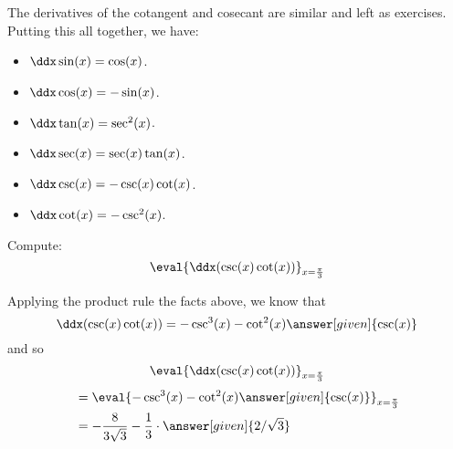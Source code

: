 \documentclass{ximera}
\begin{document}
The derivatives of the cotangent and cosecant are similar and left as
exercises.  Putting this all together, we have:

\begin{theorem} \hfil
\begin{itemize}
\item $\ddx \sin(x) = \cos(x)$.
\item $\ddx \cos(x) = -\sin(x)$.
\item $\ddx \tan(x) = \sec^2(x)$.
\item $\ddx \sec(x) = \sec(x)\tan(x)$.
\item $\ddx \csc(x) = -\csc(x)\cot(x)$.
\item $\ddx \cot(x) = -\csc^2(x)$.
\end{itemize}
\end{theorem}

\begin{example}
Compute:
\[
\eval{\ddx ( \csc(x) \cot(x) )}_{x=\frac{\pi}{3}}
\]
\begin{explanation}
Applying the product rule the facts above, we know that
\[
\ddx ( \csc(x) \cot(x) ) = - \csc^3(x) - \cot^2(x)\answer[given]{\csc(x)}
\]
and so
\[
\eval{\ddx ( \csc(x) \cot(x) )}_{x=\frac{\pi}{3}}
\]
\begin{align*}
  &= \eval{  - \csc^3(x) - \cot^2(x) \answer[given]{\csc(x)}}_{x=\frac{\pi}{3}}  \\
&= - \frac{8}{3 \sqrt{3}} - \frac{1}{3}\cdot \answer[given]{2/\sqrt{3}}
\end{align*}
\end{explanation}
\end{example}
\end{document}
